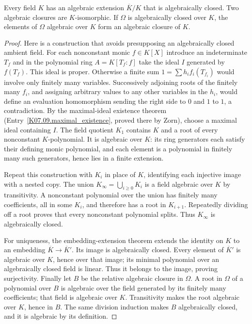 \begin{theorem}
Every field $K$ has an algebraic extension $\overline K/K$ that is algebraically closed. Two algebraic closures are $K$-isomorphic. If $\Omega$ is algebraically closed over $K$, the elements of $\Omega$ algebraic over $K$ form an algebraic closure of $K$.
\end{theorem}
\begin{proof}
Here is a construction that avoids presupposing an algebraically closed ambient field. For each nonconstant monic $f\in K[X]$ introduce an indeterminate $T_f$ and in the polynomial ring $A=K[T_f:f]$ take the ideal $I$ generated by $f(T_f)$. This ideal is proper. Otherwise a finite sum $1=\sum h_i f_i(T_{f_i})$ would involve only finitely many variables. Successively adjoining roots of the finitely many $f_i$, and assigning arbitrary values to any other variables in the $h_i$, would define an evaluation homomorphism sending the right side to $0$ and $1$ to $1$, a contradiction. By the maximal-ideal existence theorem (Entry~\ref{K07.09.maximal_existence}, proved there by Zorn), choose a maximal ideal containing $I$. The field quotient $K_1$ contains $K$ and a root of every nonconstant $K$-polynomial. It is algebraic over $K$: its ring generators each satisfy their defining monic polynomial, and each element is a polynomial in finitely many such generators, hence lies in a finite extension.

Repeat this construction with $K_i$ in place of $K$, identifying each injective image with a nested copy. The union $K_\infty=\bigcup_{i\geq0}K_i$ is a field algebraic over $K$ by transitivity. A nonconstant polynomial over the union has finitely many coefficients, all in some $K_i$, and therefore has a root in $K_{i+1}$. Repeatedly dividing off a root proves that every nonconstant polynomial splits. Thus $K_\infty$ is algebraically closed.

For uniqueness, the embedding-extension theorem extends the identity on $K$ to an embedding $\overline K\to\overline K'$. Its image is algebraically closed. Every element of $\overline K'$ is algebraic over $K$, hence over that image; its minimal polynomial over an algebraically closed field is linear. Thus it belongs to the image, proving surjectivity. Finally let $B$ be the relative algebraic closure in $\Omega$. A root in $\Omega$ of a polynomial over $B$ is algebraic over the field generated by its finitely many coefficients; that field is algebraic over $K$. Transitivity makes the root algebraic over $K$, hence in $B$. The same division induction makes $B$ algebraically closed, and it is algebraic by its definition.
\end{proof}

